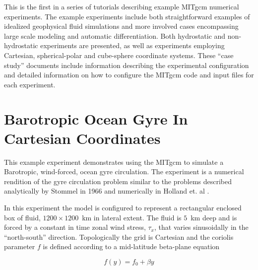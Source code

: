 

%
%

This is the first in a series of tutorials describing
example MITgcm numerical experiments. The example experiments 
include both straightforward examples of idealized geophysical 
fluid simulations and more involved cases encompassing
large scale modeling and
automatic differentiation. Both hydrostatic and non-hydrostatic 
experiments are presented, as well as experiments employing
Cartesian, spherical-polar and cube-sphere coordinate systems.
These ``case study'' documents include information describing
the experimental configuration and detailed information on how to
configure the MITgcm code and input files for each experiment.

\section[Barotropic Gyre MITgcm Example]{Barotropic Ocean Gyre In Cartesian Coordinates}
\label{sect:eg-baro}
\label{www:tutorials}


This example experiment demonstrates using the MITgcm to simulate
a Barotropic, wind-forced, ocean gyre circulation. The experiment 
is a numerical rendition of the gyre circulation problem similar
to the problems described analytically by Stommel in 1966 
\cite{Stommel66} and numerically in Holland et. al \cite{Holland75}.

In this experiment the model 
is configured to represent a rectangular enclosed box of fluid,
$1200 \times 1200 $~km in lateral extent. The fluid is $5$~km deep and is forced
by a constant in time zonal wind stress, $\tau_x$, that varies sinusoidally
in the ``north-south'' direction. Topologically the grid is Cartesian and 
the coriolis parameter $f$ is defined according to a mid-latitude beta-plane 
equation

\begin{equation}
\label{EQ:eg-baro-fcori}
f(y) = f_{0}+\beta y
\end{equation}
 
